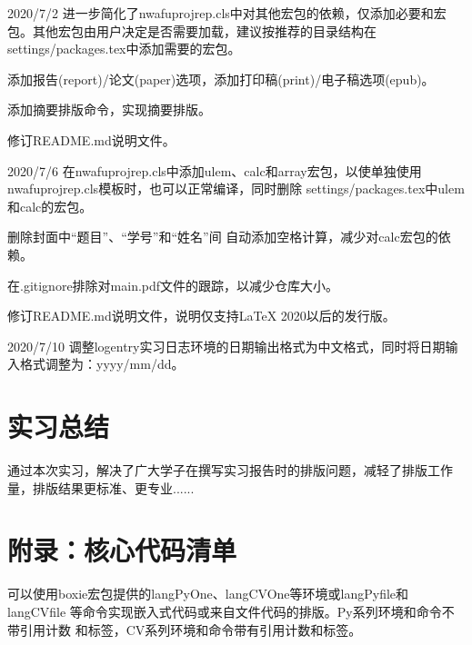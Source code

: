 \documentclass[
  ]{nwafuprojrep}
\begin{document}
\begin{logentry}[简化模板宏包依赖]{2020/7/2}
  进一步简化了nwafuprojrep.cls中对其他宏包的依赖，仅添加必要和宏包。其他宏包由用户决定是否需要加载，建议按推荐的目录结构在settings/packages.tex中添加需要的宏包。
  
  添加报告(report)/论文(paper)选项，添加打印稿(print)/电子稿选项(epub)。
  
  添加摘要排版命令，实现摘要排版。
  
  修订README.md说明文件。
\end{logentry}

\begin{logentry}[调整模板宏包]{2020/7/6}
  在nwafuprojrep.cls中添加ulem、calc和array宏包，以使单独使用
  nwafuprojrep.cls模板时，也可以正常编译，同时删除
  settings/packages.tex中ulem和calc的宏包。
  
  删除封面中\enquote{题目}、\enquote{学号}和\enquote{姓名}间
  自动添加空格计算，减少对calc宏包的依赖。
  
  在.gitignore排除对main.pdf文件的跟踪，以减少仓库大小。
  
  修订README.md说明文件，说明仅支持LaTeX 2020以后的发行版。
\end{logentry}

\begin{logentry}[调整实习日志日期输出格式]{2020/7/10}
  调整logentry实习日志环境的日期输出格式为中文格式，同时将日期输入格式调整为：yyyy/mm/dd。
\end{logentry}

\section{实习总结}
通过本次实习，解决了广大学子在撰写实习报告时的排版问题，减轻了排版工作量，排版结果更标准、更专业......

\section{附录：核心代码清单}\label{secboxiety}
可以使用boxie宏包提供的langPyOne、langCVOne等环境或langPyfile和langCVfile
等命令实现嵌入式代码或来自文件代码的排版。Py系列环境和命令不带引用计数
和标签，CV系列环境和命令带有引用计数和标签。
\end{document}
